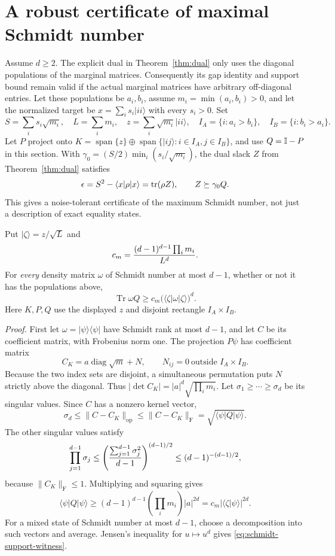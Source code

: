 \section{A robust certificate of maximal Schmidt number}\label{sec:robust-sn}
Assume $d\ge2$. The explicit dual in Theorem~\ref{thm:dual} only uses the diagonal
populations of the marginal matrices. Consequently its gap identity and
support bound remain valid if the actual marginal matrices have arbitrary
off-diagonal entries. Let these populations be $a_i,b_i$, assume
$m_i=\min(a_i,b_i)>0$, and let the normalized target be
$x=\sum_i s_i|ii\rangle$ with every $s_i>0$.
Set
\[
 S=\sum_i s_i\sqrt{m_i},\quad L=\sum_i m_i,\quad
 z=\sum_i\sqrt{m_i}|ii\rangle,\quad
 I_A=\{i:a_i>b_i\},\quad I_B=\{i:b_i>a_i\}.
\]
Let $P$ project onto
$K=\operatorname{span}\{z\}\oplus
\operatorname{span}\{|ij\rangle:i\in I_A,j\in I_B\}$,
and use $Q=\mathbb I-P$ in this section. With
$\gamma_0=(S/2)\min_i(s_i/\sqrt{m_i})$, the dual slack $Z$ from
Theorem~\ref{thm:dual} satisfies
\begin{equation}\label{eq:dual-exact-deficit}
 \epsilon=S^2-\langle x|\rho|x\rangle=\operatorname{tr}(\rho Z),
 \qquad Z\succeq\gamma_0 Q.
\end{equation}
This gives a noise-tolerant certificate of the maximum Schmidt number,
not just a description of exact equality states.

Put $|\zeta\rangle=z/\sqrt L$ and
\[
 c_m={(d-1)^{d-1}\prod_i m_i\over L^d}.
\]
For \emph{every} density matrix $\omega$ of Schmidt number at most $d-1$,
whether or not it has the populations above,
\begin{equation}\label{eq:schmidt-support-witness}
 \operatorname{Tr}\omega Q\ge
       c_m\bigl(\langle\zeta|\omega|\zeta\rangle\bigr)^d.
\end{equation}
Here $K,P,Q$ use the displayed $z$ and disjoint rectangle $I_A\times I_B$.

\emph{Proof.} First let $\omega=|\psi\rangle\langle\psi|$ have Schmidt
rank at most $d-1$, and let $C$ be its coefficient matrix, with Frobenius
norm one. The projection $P\psi$ has coefficient matrix
\[
 C_K=a\operatorname{diag}\sqrt m+N,
 \qquad N_{ij}=0\ \text{outside }I_A\times I_B.
\]
Because the two index sets are disjoint, a simultaneous permutation puts
$N$ strictly above the diagonal. Thus
$|\det C_K|=|a|^d\sqrt{\prod_i m_i}$.
Let $\sigma_1\ge\cdots\ge\sigma_d$ be its singular values.
Since $C$ has a nonzero kernel vector,
\[
 \sigma_d\le\|C-C_K\|_{\mathrm{op}}\le\|C-C_K\|_{\mathrm F}
                         =\sqrt{\langle\psi|Q|\psi\rangle}.
\]
The other singular values satisfy
\[
 \prod_{j=1}^{d-1}\sigma_j
 \le\left({\sum_{j=1}^{d-1}\sigma_j^2\over d-1}\right)^{(d-1)/2}
 \le(d-1)^{-(d-1)/2},
\]
because $\|C_K\|_{\mathrm F}\le1$. Multiplying and squaring gives
\[
 \langle\psi|Q|\psi\rangle
       \ge(d-1)^{d-1}\left(\prod_i m_i\right)|a|^{2d}
       =c_m|\langle\zeta|\psi\rangle|^{2d}.
\]
For a mixed state of Schmidt number at most $d-1$, choose a decomposition
into such vectors and average. Jensen's inequality for $u\mapsto u^d$
gives \eqref{eq:schmidt-support-witness}.

